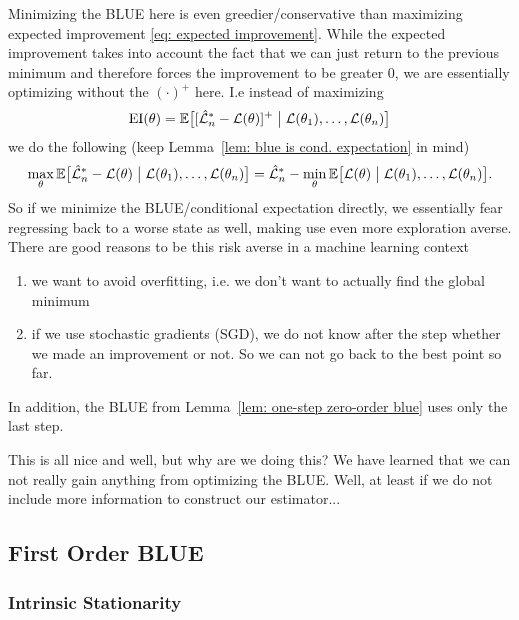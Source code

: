 Minimizing the BLUE here is even greedier/conservative than maximizing
expected improvement \eqref{eq: expected improvement}. While the expected
improvement takes into account the fact that we can just return to the previous
minimum and therefore forces the improvement to be greater \(0\), we are
essentially optimizing without the \((\cdot)^+\) here. I.e instead of
maximizing
\begin{equation*}
	\operatorname{EI}(\theta) = \mathbb{E}\big[
			[\hat{\mathcal{L}}_n^*- \mathcal{L}(\theta)]^+
			\bigm|
			\mathcal{L}(\theta_1),\dots, \mathcal{L}(\theta_n)
		\big]
\end{equation*}
we do the following (keep Lemma~\ref{lem: blue is cond. expectation} in mind)
\begin{equation*}
	\max_{\theta} \mathbb{E}\big[
		\hat{\mathcal{L}}_n^*- \mathcal{L}(\theta)
		\bigm|
		\mathcal{L}(\theta_1),\dots, \mathcal{L}(\theta_n)
	\big]
	= \hat{\mathcal{L}}_n^* - \min_{\theta} \mathbb{E}\big[
		\mathcal{L}(\theta)
		\bigm|
		\mathcal{L}(\theta_1),\dots, \mathcal{L}(\theta_n)
	\big].
\end{equation*}
So if we minimize the BLUE/conditional expectation directly, we essentially fear
regressing back to a worse state as well, making use even more exploration
averse. There are good reasons to be this risk averse in a machine learning
context
\begin{enumerate}
	\item we want to avoid overfitting, i.e. we don't want to actually find the
	global minimum
	\item if we use stochastic gradients (SGD), we do not know after the step
	whether we made an improvement or not. So we can not go back to the best
	point so far.
\end{enumerate}
In addition, the BLUE from Lemma~\ref{lem: one-step zero-order blue}
uses only the last step.

This is all nice and well, but why are we doing this? We have learned that we
can not really gain anything from optimizing the BLUE. Well, at least if we do
not include more information to construct our estimator...

\subsection{First Order BLUE}

\subsubsection{Intrinsic Stationarity}

